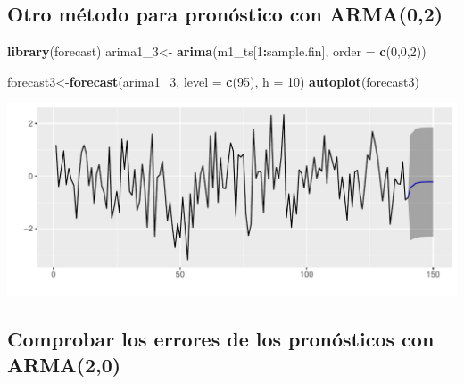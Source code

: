 \documentclass[
  11pt,
]{article}
\newenvironment{Shaded}{\begin{snugshade}}{\end{snugshade}}
\newcommand{\DataTypeTok}[1]{\textcolor[rgb]{0.13,0.29,0.53}{#1}}
\newcommand{\DecValTok}[1]{\textcolor[rgb]{0.00,0.00,0.81}{#1}}
\newcommand{\KeywordTok}[1]{\textcolor[rgb]{0.13,0.29,0.53}{\textbf{#1}}}
\newcommand{\NormalTok}[1]{#1}
\newcommand{\OperatorTok}[1]{\textcolor[rgb]{0.81,0.36,0.00}{\textbf{#1}}}
\newcommand{\StringTok}[1]{\textcolor[rgb]{0.31,0.60,0.02}{#1}}
\begin{document}
\hypertarget{otro-muxe9todo-para-pronuxf3stico-con-arma02}{%
\subsection{Otro método para pronóstico con
ARMA(0,2)}\label{otro-muxe9todo-para-pronuxf3stico-con-arma02}}

\begin{Shaded}
\begin{Highlighting}[]
\KeywordTok{library}\NormalTok{(forecast)}
\NormalTok{arima1_}\DecValTok{3}\NormalTok{<-}\StringTok{ }\KeywordTok{arima}\NormalTok{(m1_ts[}\DecValTok{1}\OperatorTok{:}\NormalTok{sample.fin], }\DataTypeTok{order =} \KeywordTok{c}\NormalTok{(}\DecValTok{0}\NormalTok{,}\DecValTok{0}\NormalTok{,}\DecValTok{2}\NormalTok{))}
\end{Highlighting}
\end{Shaded}

\begin{Shaded}
\begin{Highlighting}[]
\NormalTok{forecast3<-}\KeywordTok{forecast}\NormalTok{(arima1_}\DecValTok{3}\NormalTok{, }\DataTypeTok{level =} \KeywordTok{c}\NormalTok{(}\DecValTok{95}\NormalTok{), }\DataTypeTok{h =} \DecValTok{10}\NormalTok{)}
\KeywordTok{autoplot}\NormalTok{(forecast3)}
\end{Highlighting}
\end{Shaded}

\begin{center}\includegraphics[width=0.9\linewidth]{RmdFigs/f_otro1-1} \end{center}

\hypertarget{comprobar-los-errores-de-los-pronuxf3sticos-con-arma20}{%
\subsection{Comprobar los errores de los pronósticos con
ARMA(2,0)}\label{comprobar-los-errores-de-los-pronuxf3sticos-con-arma20}}
\end{document}

